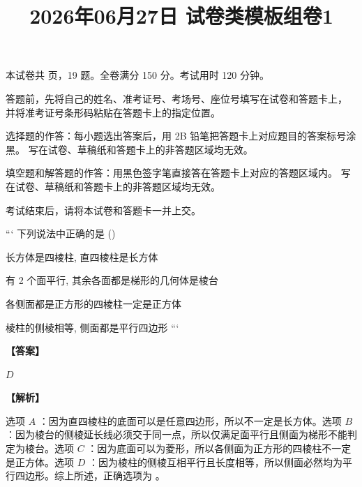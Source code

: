 \documentclass{exam-zh}
\title{2026年06月27日 试卷类模板组卷1}
\newenvironment{answer}{\par\vspace{0.5em}\noindent\textbf{【答案】}\par}{\par\vspace{1em}}
\newenvironment{solutions}{\par\vspace{0.5em}\noindent\textbf{【解析】}\par}{\par\vspace{1em}}\usepackage{lastpage}
\begin{document}

\secret

\maketitle
\begin{center}
    本试卷共 \pageref{LastPage} 页，19 题。全卷满分 150 分。考试用时 120 分钟。
\end{center}


\begin{notice}
  \item 答题前，先将自己的姓名、准考证号、考场号、座位号填写在试卷和答题卡上，
    并将准考证号条形码粘贴在答题卡上的指定位置。
  \item 选择题的作答：每小题选出答案后，用 2B 铅笔把答题卡上对应题目的答案标号涂黑。
    写在试卷、草稿纸和答题卡上的非答题区域均无效。
  \item 填空题和解答题的作答：用黑色签字笔直接答在答题卡上对应的答题区域内。
    写在试卷、草稿纸和答题卡上的非答题区域均无效。
  \item 考试结束后，请将本试卷和答题卡一并上交。
\end{notice}




\begin{question}
```
下列说法中正确的是 (\hspace{1cm})
\begin{choices}
\item 长方体是四棱柱, 直四棱柱是长方体
\item 有 2 个面平行, 其余各面都是梯形的几何体是棱台
\item 各侧面都是正方形的四棱柱一定是正方体
\item 棱柱的侧棱相等, 侧面都是平行四边形
```
\end{choices}
\end{question}

\begin{answer}
$D$
\end{answer}

\begin{solutions}
选项 $A$ ：因为直四棱柱的底面可以是任意四边形，所以不一定是长方体。选项 $B$ ：因为棱台的侧棱延长线必须交于同一点，所以仅满足面平行且侧面为梯形不能判定为棱台。选项 $C$ ：因为底面可以为菱形，所以各侧面为正方形的四棱柱不一定是正方体。选项 $D$ ：因为棱柱的侧棱互相平行且长度相等，所以侧面必然均为平行四边形。综上所述，正确选项为 。
\end{solutions}
\end{document}
